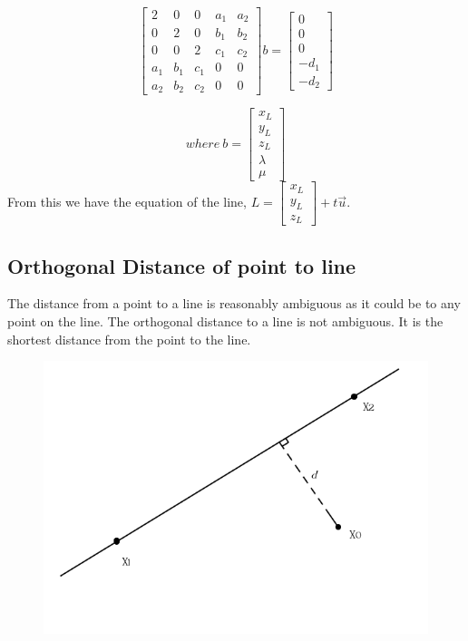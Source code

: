 	
	\[
	\begin{bmatrix}
	2 & 0 & 0 & a_1 & a_2 \\
	0 & 2 & 0 & b_1 & b_2 \\
	0 & 0 & 2 & c_1 & c_2 \\
	a_1 & b_1 & c_1 & 0 & 0 \\
	a_2 & b_2 & c_2 & 0 & 0
	\end{bmatrix}
	b=
	\begin{bmatrix}
	0 \\
	0\\
	0 \\
	-d_1 \\
	-d_2 
	\end{bmatrix}
	\]
	
	\[
	where\: b = 	\begin{bmatrix}
		x_L \\
		y_L\\
		z_L \\
		\lambda \\
		\mu 
	\end{bmatrix}
	\]
	\newline
	\newline
	From this we have the equation of the line, $L = \begin{bmatrix}
	x_L \\
	y_L\\
	z_L 
	\end{bmatrix} + t\vec{u}$.
	
	\subsection{Orthogonal Distance of point to line}
	
	The distance from a point to a line is reasonably ambiguous as it could be to any point on the line. The orthogonal distance to a line is not ambiguous. It is the shortest distance from the point to the line.
	
	\begin{figure}[H]
		\centering
		\includegraphics[width=0.7\linewidth]{"Includes/images/OrthogDist to line"}
		\caption{}
		\label{fig:OrthogDisttoline}
	\end{figure}
	
